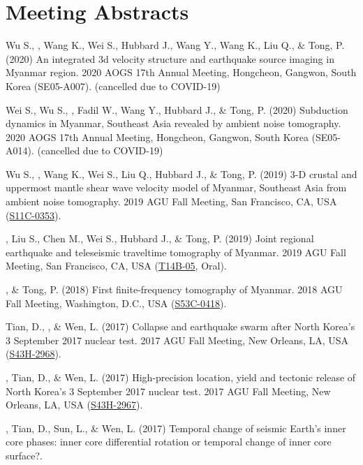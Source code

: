 \section{Meeting Abstracts}

\begin{etaremune}
\item Wu S., \Yao, Wang K., Wei S., Hubbard J., Wang Y., Wang K., Liu Q., \& Tong, P. (2020)
    An integrated 3d velocity structure and earthquake source imaging in Myanmar region.
    2020 AOGS 17th Annual Meeting, Hongcheon, Gangwon, South Korea (SE05-A007). (cancelled due to COVID-19)
\item
    Wei S., Wu S., \Yao, Fadil W., Wang Y., Hubbard J., \& Tong, P. (2020)
    Subduction dynamics in Myanmar, Southeast Asia revealed by ambient noise tomography.
    2020 AOGS 17th Annual Meeting, Hongcheon, Gangwon, South Korea (SE05-A014). (cancelled due to COVID-19)
\item
    Wu S., \Yao, Wang K., Wei S., Liu Q., Hubbard J., \& Tong, P. (2019)
    3-D crustal and uppermost mantle shear wave velocity model of Myanmar, Southeast Asia from ambient noise tomography.
    2019 AGU Fall Meeting, San Francisco, CA, USA (\href{https://agu.confex.com/agu/fm19/meetingapp.cgi/Paper/511238}{S11C-0353}).
\item
    \Yao, Liu S., Chen M., Wei S., Hubbard J., \& Tong, P. (2019)
    Joint regional earthquake and teleseismic traveltime tomography of Myanmar.
    2019 AGU Fall Meeting, San Francisco, CA, USA (\href{https://agu.confex.com/agu/fm19/meetingapp.cgi/Paper/532179}{T14B-05}, Oral).
\item
    \Yao, \& Tong, P. (2018)
    First finite-frequency tomography of Myanmar.
    2018 AGU Fall Meeting, Washington, D.C., USA (\href{http://adsabs.harvard.edu/abs/2018AGUFM.S53C0418Y}{S53C-0418}).
\item
    Tian, D., \Yao, \& Wen, L. (2017)
    Collapse and earthquake swarm after North Korea's 3 September 2017 nuclear test.
    2017 AGU Fall Meeting, New Orleans, LA, USA (\href{http://adsabs.harvard.edu/abs/2017AGUFM.S43H2968T}{S43H-2968}).
\item
    \Yao, Tian, D., \& Wen, L. (2017)
    High-precision location, yield and tectonic release of North Korea's 3 September 2017 nuclear test.
    2017 AGU Fall Meeting, New Orleans, LA, USA (\href{http://adsabs.harvard.edu/abs/2017AGUFM.S43H2967Y}{S43H-2967}).
\item
    \Yao, Tian, D., Sun, L., \& Wen, L. (2017)
    Temporal change of seismic Earth's inner core phases: inner core differential rotation or temporal change of inner core surface?.

\end{etaremune}
